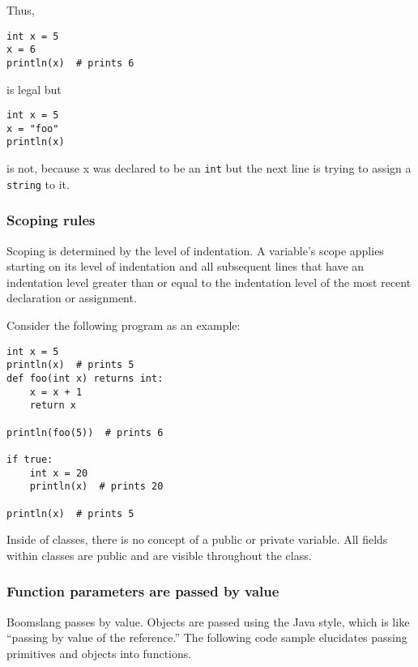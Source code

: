 \documentclass{article}
\begin{document}
Thus,
\begin{verbatim}
int x = 5
x = 6
println(x)  # prints 6
\end{verbatim}
is legal but
\begin{verbatim}
int x = 5
x = "foo"
println(x)
\end{verbatim}
is not, because x was declared to be an \texttt{int} but the next line is trying to assign a \texttt{string} to it.

\subsubsection{Scoping rules}
Scoping is determined by the level of indentation. A variable's scope applies starting on its level of indentation and all subsequent lines that have an indentation level greater than or equal to the indentation level of the most recent declaration or assignment.

Consider the following program as an example:

\begin{verbatim}
int x = 5
println(x)  # prints 5
def foo(int x) returns int:
    x = x + 1
    return x

println(foo(5))  # prints 6

if true:
    int x = 20
    println(x)  # prints 20
    
println(x)  # prints 5
\end{verbatim}

Inside of classes, there is no concept of a public or private variable. All fields within classes are public and are visible throughout the class.

\subsubsection{Function parameters are passed by value}
Boomslang passes by value. Objects are passed using the Java style, which is like ``passing by value of the reference.'' The following code sample elucidates passing primitives and objects into functions. 
\end{document}
